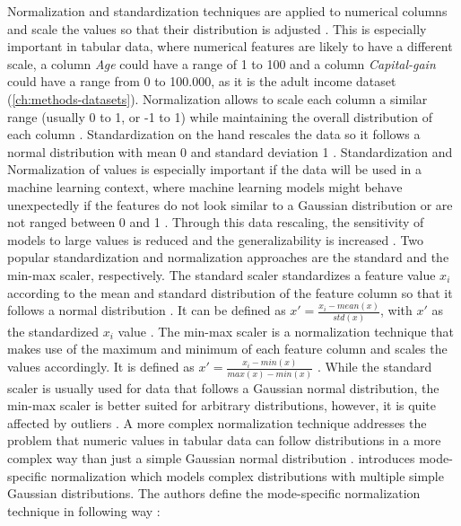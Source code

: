 Normalization and standardization techniques are applied to numerical columns and scale the values so that their distribution is adjusted \cite{garcia2016BigDataPreprocessing}.
This is especially important in tabular data, where numerical features are likely to have a different scale, \eg a column \textit{Age} could have a range of 1 to 100 and a column \textit{Capital-gain} could have a range from 0 to 100.000, as it is the adult income dataset \cite{Dua:2019} (\autoref{ch:methods-datasets}).
Normalization allows to scale each column a similar range (usually 0 to 1, or -1 to 1) while maintaining the overall distribution of each column \cite{izonin2022TwoStepDataNormalization}.
Standardization on the hand rescales the data so it follows a normal distribution with mean 0 and standard deviation 1 \cite{scikit-learndevelopers2023PreprocessingData}.
Standardization and Normalization of values is especially important if the data will be used in a machine learning context, where machine learning models might behave unexpectedly if 
the features do not look similar to a Gaussian distribution or are not ranged between 0 and 1 \cite{scikit-learn, scikit-learndevelopers2023PreprocessingData}.
Through this data rescaling, the sensitivity of models to large values is reduced and the generalizability is increased \cite{izonin2022TwoStepDataNormalization}.
Two popular standardization and normalization approaches are the standard and the min-max scaler, respectively.
The standard scaler standardizes a feature value $x_i$ according to the mean and standard distribution of the feature column so that it follows a normal distribution \cite{garcia2016BigDataPreprocessing, izonin2022TwoStepDataNormalization}.
It can be defined as $x' = \frac{x_i-mean(x)}{std(x)}$, with $x'$ as the standardized $x_i$ value \cite{izonin2022TwoStepDataNormalization}.
The min-max scaler is a normalization technique that makes use of the maximum and minimum of each feature column and scales the values accordingly.
It is defined as $x' = \frac{x_i - min(x)}{max(x) - min(x)}$ \cite{izonin2022TwoStepDataNormalization}.
While the standard scaler is usually used for data that follows a Gaussian normal distribution, the min-max scaler is better suited for arbitrary distributions, however, it is quite affected by outliers \cite{choudhury2020FeatureScalingEffect}.
A more complex normalization technique addresses the problem that numeric values in tabular data can follow distributions in a more complex way than just a simple Gaussian normal distribution \cite{zhao2022CTABGANEnhancingTabular, xu2019ModelingTabularData}.
\textcite{xu2019ModelingTabularData} introduces mode-specific normalization which models complex distributions with multiple simple Gaussian distributions.
The authors define the mode-specific normalization technique in following way \cite[p. 3-4]{xu2019ModelingTabularData}:


